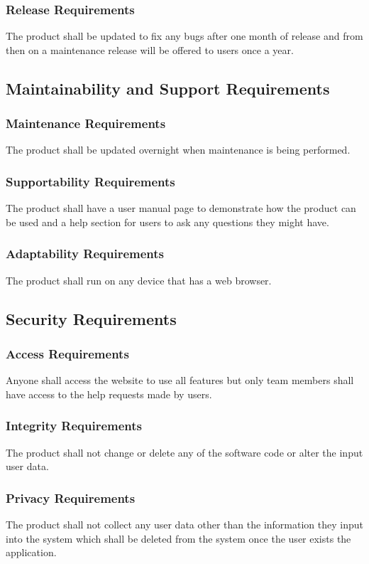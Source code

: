 \documentclass[11pt, oneside]{article}
\begin{document}
\subsubsection{Release Requirements}
The product shall be updated to fix any bugs after one month of release and from then on a maintenance release will be offered to users once a year.


\subsection{Maintainability and Support Requirements}
\subsubsection{Maintenance Requirements}
The product shall be updated overnight when maintenance is being performed.


\subsubsection{Supportability Requirements}
The product shall have a user manual page to demonstrate how the product can be used and a help section for users to ask any questions they might have.


\subsubsection{Adaptability Requirements}
The product shall run on any device that has a web browser.


\subsection{Security Requirements}
\subsubsection{Access Requirements}
Anyone shall access the website to use all features but only team members shall have access to the help requests made by users.


\subsubsection{Integrity Requirements}
The product shall not change or delete any of the software code or alter the input user data.


\subsubsection{Privacy Requirements}
The product shall not collect any user data other than the information they input into the system which shall be deleted from the system once the user exists the application.
\end{document}
